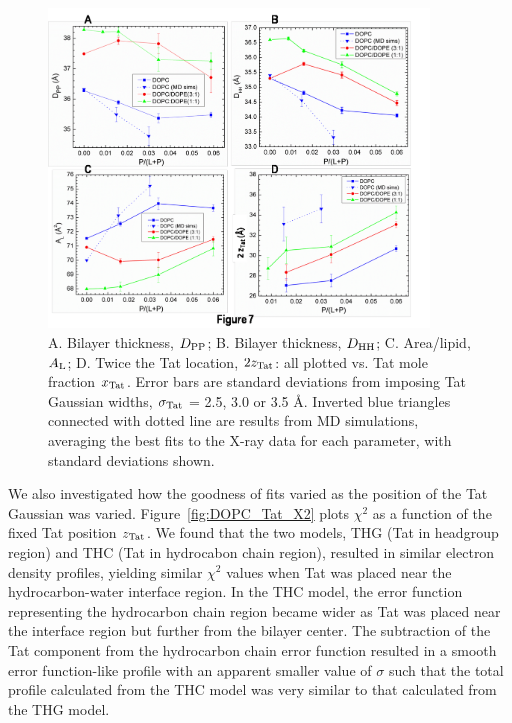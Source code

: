 \begin{figure}
  \centering
  \includegraphics[width=0.9\textwidth]{figures/Tat/figure7}
  \caption{A. Bilayer thickness, $D_\textrm{PP}$; B. Bilayer thickness, $D_\textrm{HH}$; 
  C. Area/lipid, $A_\textrm{L}$; D. Twice the Tat location, $2z_\textrm{Tat}$: 
  all plotted vs. Tat mole fraction $x_\textrm{Tat}$. 
  Error bars are standard deviations from imposing Tat Gaussian widths, 
  $\sigma_\textrm{Tat}$ = 2.5, 3.0 or 3.5 \AA. Inverted blue triangles connected
  with dotted line are results from MD simulations, averaging the best fits to the X-ray data for
  each parameter, with standard deviations shown.}
  \label{fig:figure7}
\end{figure}

We also investigated how the goodness of fits varied as the position of 
the Tat Gaussian was varied. Figure~\ref{fig:DOPC_Tat_X2} plots $\chi^2$ as a 
function of the fixed Tat position $z_\textrm{Tat}$. We found that the two models,
THG (Tat in headgroup region) and THC (Tat in hydrocabon chain region), resulted 
in similar electron density profiles, yielding similar $\chi^2$ values 
when Tat was placed near the hydrocarbon-water interface region. In the THC model, 
the error function representing the hydrocarbon chain region became wider as
Tat was placed near the interface region but further from the bilayer center. The subtraction
of the Tat component from the hydrocarbon chain error function resulted in 
a smooth error function-like profile with an apparent smaller value of $\sigma$ such that
the total profile calculated from the THC model was very similar to that calculated 
from the THG model.

